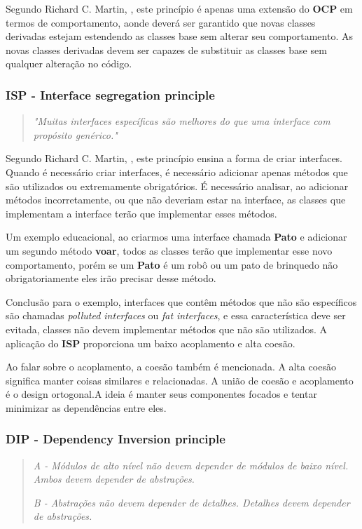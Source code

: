 \documentclass[12pt]{article}
\begin{document}
Segundo Richard C. Martin, \cite{ROBERT_MARTIN_THE_CLEAN_ARCHITECTURE}, este princípio é apenas uma extensão do \textbf{OCP} em termos de comportamento, aonde deverá ser garantido que novas classes derivadas estejam estendendo as classes base sem alterar seu comportamento. As novas classes derivadas devem ser capazes de substituir as classes base sem qualquer alteração no código.

\subsubsection{ISP - Interface segregation principle}
\begin{quote}
	\textit{"Muitas interfaces específicas são melhores do que uma interface com propósito genérico."}	
\end{quote}

Segundo Richard C. Martin, \cite{ROBERT_MARTIN_THE_CLEAN_ARCHITECTURE}, este princípio ensina a forma de criar interfaces. Quando é necessário criar interfaces, é necessário adicionar apenas métodos que são utilizados ou extremamente obrigatórios. É necessário analisar, ao adicionar métodos incorretamente, ou que não deveriam estar na interface, as classes que implementam a interface terão que implementar esses métodos. 

Um exemplo educacional, ao criarmos uma interface chamada \textbf{Pato} e adicionar um segundo método \textbf{voar}, todos as classes terão que implementar esse novo comportamento, porém se um \textbf{Pato} é um robô ou um pato de brinquedo não obrigatoriamente eles irão precisar desse método.

Conclusão para o exemplo, interfaces que contêm métodos que não são específicos são chamadas \textit{polluted interfaces} ou \textit{fat interfaces}, e essa característica deve ser evitada, classes não devem implementar métodos que não são utilizados. A aplicação do \textbf{ISP} proporciona um baixo acoplamento e alta coesão.

Ao falar sobre o acoplamento, a coesão também é mencionada. A alta coesão significa manter coisas similares e relacionadas. A união de coesão e acoplamento é o design ortogonal.A ideia é manter seus componentes focados e tentar minimizar as dependências entre eles.

\subsubsection{DIP - Dependency Inversion principle}
\begin{quote}
	\textit{A - Módulos de alto nível não devem depender de módulos de baixo nível. Ambos devem depender de abstrações.}
	
	\textit{B -  Abstrações não devem depender de detalhes. Detalhes devem depender de abstrações.}	
\end{quote}
\end{document}

